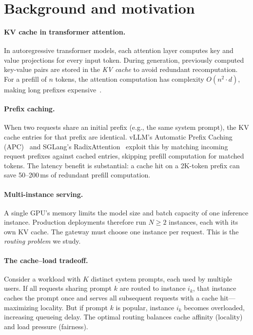 \documentclass{article}
\begin{document}
\section{Background and motivation}
\label{sec:background}

\paragraph{KV cache in transformer attention.}
In autoregressive transformer models, each attention layer computes key and value projections for every input token. During generation, previously computed key-value pairs are stored in the \emph{KV cache} to avoid redundant recomputation. For a prefill of $n$ tokens, the attention computation has complexity $O(n^2 \cdot d)$, making long prefixes expensive~\citep{kwon2023pagedattention}.

\paragraph{Prefix caching.}
When two requests share an initial prefix (e.g., the same system prompt), the KV cache entries for that prefix are identical. vLLM's Automatic Prefix Caching (APC)~\citep{kwon2023pagedattention} and SGLang's RadixAttention~\citep{zheng2024sglang} exploit this by matching incoming request prefixes against cached entries, skipping prefill computation for matched tokens. The latency benefit is substantial: a cache hit on a 2K-token prefix can save 50--200\,ms of redundant prefill computation.

\paragraph{Multi-instance serving.}
A single GPU's memory limits the model size and batch capacity of one inference instance. Production deployments therefore run $N \geq 2$ instances, each with its own KV cache. The gateway must choose one instance per request. This is the \emph{routing problem} we study.

\paragraph{The cache--load tradeoff.}
Consider a workload with $K$ distinct system prompts, each used by multiple users. If all requests sharing prompt $k$ are routed to instance $i_k$, that instance caches the prompt once and serves all subsequent requests with a cache hit---maximizing locality. But if prompt $k$ is popular, instance $i_k$ becomes overloaded, increasing queueing delay. The optimal routing balances cache affinity (locality) and load pressure (fairness).
\end{document}
